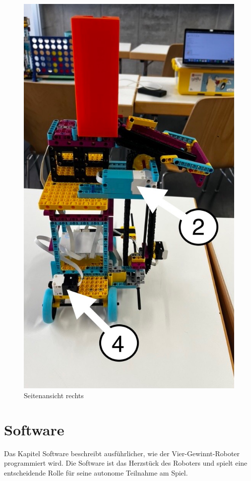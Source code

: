 \begin{figure}[H]
\begin{minipage}[b]{0.48\linewidth}
		\centering
		\includegraphics[width=\linewidth]{images/DAE26A50-277E-4C6B-96A3-F2DE2CC9C004_1_105_c}
		\caption{Seitenansicht rechts}
		\label{fig:seitenansicht-rechts}
	\end{minipage}
\end{figure}


\section{Software}
Das Kapitel Software beschreibt ausführlicher, wie der Vier-Gewinnt-Roboter programmiert wird. Die Software ist das Herzstück des Roboters und spielt eine entscheidende Rolle für seine autonome Teilnahme am Spiel.

